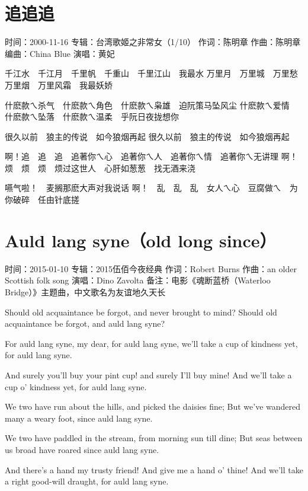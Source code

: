 \documentclass[UTF8,a4paper,oneside,twocolumn,12pt]{ctexbook}
\newcommand{\infopair}[2]{\textbullet #1：#2}
\newcommand{\zc}[1][伍佰]{\infopair{作词}{#1}}
\newcommand{\zq}[1][伍佰]{\infopair{作曲}{#1}}
\newcommand{\bq}[1][伍佰]{\infopair{编曲}{#1}}
\newcommand{\zj}[1]{\infopair{专辑}{#1}}
\newcommand{\sj}[1]{\infopair{时间}{#1}}
\newcommand{\bz}[1]{\infopair{备注}{#1}}
\newenvironment{info}{\begin{flushleft}\kaishu
	}
	{\end{flushleft}\normalsize\yahei\par}
\newenvironment{lyric}{
	}
{}
\begin{document}
\section{追追追}
\begin{info}
	\sj{2000-11-16}
	\zj{台湾歌姬之非常女（1/10）}
	\zc[陈明章]
	\zq[陈明章]
	\bq[China Blue]
	\infopair{演唱}{黄妃}
\end{info}
\begin{lyric}
	千江水　千江月　千里帆　千重山　千里江山　我最水
	万里月　万里城　万里愁　万里烟　万里风霜　我最妖娇

	什麽款ㄟ杀气　什麽款ㄟ角色　什麽款ㄟ枭雄　迫阮策马坠风尘
	什麽款ㄟ爱情　什麽款ㄟ坠落　什麽款ㄟ温柔　乎阮日夜拢想你

	很久以前　狼主的传说　如今狼烟再起
	很久以前　狼主的传说　如今狼烟再起

	啊！追　追　追　追著你ㄟ心　追著你ㄟ人　追著你ㄟ情　追著你ㄟ无讲理
	啊！烦　烦　烦　烦过这世人　心肝如葱葱　找无酒来浇

	嚥气啦！　麦搁那麽大声对我说话
	啊！　乱　乱　乱　女人ㄟ心　豆腐做ㄟ　为你破碎　任由针底搓
\end{lyric}

\section{Auld lang syne（old long since）}
\begin{info}
	\sj{2015-01-10}
	\zj{2015伍佰今夜经典}
	\zc[Robert Burns]
	\zq[an older Scottish folk song]
	\infopair{演唱}{Dino Zavolta}
	\bz{电影《魂断蓝桥（Waterloo Bridge）》主题曲，中文歌名为友谊地久天长}
\end{info}
\begin{lyric}
	Should old acquaintance be forgot,
	and never brought to mind?
	Should old acquaintance be forgot,
	and auld lang syne?

	For auld lang syne, my dear,
	for auld lang syne,
	we'll take a cup of kindness yet,
	for auld lang syne.

	And surely you'll buy your pint cup!
	and surely I'll buy mine!
	And we'll take a cup o' kindness yet,
	for auld lang syne.

	We two have run about the hills,
	and picked the daisies fine;
	But we've wandered many a weary foot,
	since auld lang syne.

	We two have paddled in the stream,
	from morning sun till dine;
	But seas between us broad have roared
	since auld lang syne.

	And there's a hand my trusty friend!
	And give me a hand o' thine!
	And we'll take a right good-will draught,
	for auld lang syne.
\end{lyric}
\end{document}
